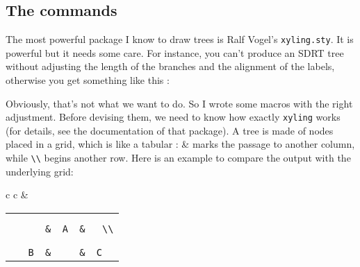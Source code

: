 \documentclass[a4paper]{article}
\begin{document}
\subsection{The commands}
The most powerful package I know to draw trees is Ralf Vogel's \texttt{xyling.sty}. It is powerful but it needs some care. For instance, you can't produce an SDRT tree without adjusting the length of the branches and the alignment of the labels, otherwise you get something like this :
\begin{center}
\end{center}
Obviously, that's not what we want to do. So I wrote some macros with the right adjustment. Before devising them, we need to know how exactly \texttt{xyling} works (for details, see the documentation of that package). A tree is made of nodes placed in a grid, which is like a tabular : \& marks the passage to another column, while \verb+\\+ begins another row. Here is an example to compare the output with the underlying grid:
\begin{center}
\begin{tabular}{c c}
&
\begin{tabular}{c}
\\\\\\\Large
\verb+      &  A  &   \\+\\
\\\\\Large
\verb+ B  &     &  C+
\normalsize
\end{tabular}
\end{tabular}
\end{center}
\end{document}
